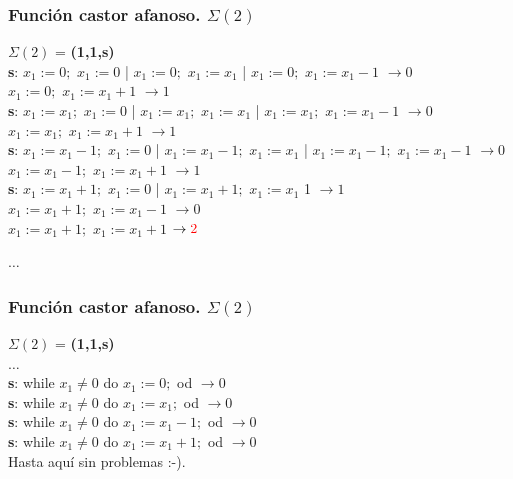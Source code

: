 \documentclass[xcolor=table]{beamer}
\begin{document}
\begin{frame}[fragile]\frametitle{Función castor afanoso.  $\Sigma(2)$} \scriptsize


        $\Sigma(2)$ = \textbf{(1,1,s)}\\
        
        \textbf{s}: $x_1:= 0;$ $x_1:=0$ | $x_1:= 0;$ $x_1:=x_1$ | $x_1:= 0;$ $x_1:=x_1-1$  $\rightarrow 0$\\\hspace{0.2cm}$x_1:= 0;$ $x_1:=x_1 +1 $ $\rightarrow 1$ \\
       
        \textbf{s}: $x_1:= x_1;$ $x_1:=0$ |  $x_1:= x_1;$ $x_1:=x_1$ |  $x_1:= x_1;$ $x_1:=x_1 -1 $ $\rightarrow 0$ \\
        $x_1:= x_1;$ $x_1:=x_1+1$ $\rightarrow 1$\\
        
        \textbf{s}: $x_1:= x_1 -1;$ $x_1:=0$ | $x_1:= x_1 -1;$ $x_1:=x_1$  | $x_1:= x_1 -1;$ $x_1:=x_1-1$ $\rightarrow 0 $ \\
        $x_1:= x_1-1;$ $x_1:=x_1+1$ $\rightarrow 1$\\
        
        \textbf{s}: $x_1:= x_1 +1;$ $x_1:= 0$ | $x_1:= x_1 +1;$ $x_1:= x_1$ 1 $\rightarrow 1$\\
            $x_1:= x_1 +1;$ $x_1:= x_1-1$ $\rightarrow 0$\\
            $x_1:= x_1 +1;$ $x_1:= x_1+1$ $\rightarrow \textcolor{red}{2}$
            
        $\ldots$
        
\end{frame}

\begin{frame}[fragile]\frametitle{Función castor afanoso.  $\Sigma(2)$} \scriptsize


        $\Sigma(2)$ = \textbf{(1,1,s)}\\

        $\ldots$\\
          
        \textbf{s}: while $x_1 \neq 0$ do $x_1:= 0;$ od $\rightarrow 0$\\
        \textbf{s}: while $x_1 \neq 0$ do $x_1:= x_1;$ od $\rightarrow 0$\\
        \textbf{s}: while $x_1 \neq 0$ do $x_1:= x_1 -1;$ od $\rightarrow 0$\\
        \textbf{s}: while $x_1 \neq 0$ do $x_1:= x_1 +1;$ od $\rightarrow 0$ \\

    Hasta aquí sin problemas :-).
\end{frame}
\end{document}
